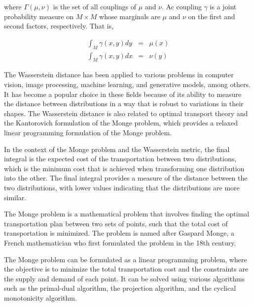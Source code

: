\documentclass[12pt]{article} %
\theoremstyle{plain}
\begin{document}
	\noindent where $\Gamma (\mu, \nu)$ is the set of all couplings of $\mu$ and $\nu$. Ac coupling $\gamma$ is a joint probability measure on $M \times M$ whose marginals are $\mu$ and $\nu$ on the first and second factors, respectively. That is,
	
	\begin{eqnarray}
		\int_{M} \gamma(x,y)dy &=& \mu(x)\\
		\int_{M} \gamma(x,y)dx &=& \nu(y) 
	\end{eqnarray}

	The Wasserstein distance has been applied to various problems in computer vision, image processing, machine learning, and generative models, among others. It has become a popular choice in these fields because of its ability to measure the distance between distributions in a way that is robust to variations in their shapes. The Wasserstein distance is also related to optimal transport theory and the Kantorovich formulation of the Monge problem, which provides a relaxed linear programming formulation of the Monge problem.
	
	In the context of the Monge problem and the Wasserstein metric, the final integral is the expected cost of the transportation between two distributions, which is the minimum cost that is achieved when transforming one distribution into the other. The final integral provides a measure of the distance between the two distributions, with lower values indicating that the distributions are more similar.
	
	
	The Monge problem is a mathematical problem that involves finding the optimal transportation plan between two sets of points, such that the total cost of transportation is minimized. The problem is named after Gaspard Monge, a French mathematician who first formulated the problem in the 18th century.
	
	The Monge problem can be formulated as a linear programming problem, where the objective is to minimize the total transportation cost and the constraints are the supply and demand of each point. It can be solved using various algorithms such as the primal-dual algorithm, the projection algorithm, and the cyclical monotonicity algorithm.
	
\end{document}
